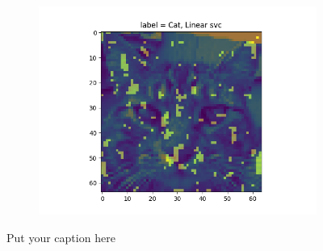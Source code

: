 \documentclass{article}
\begin{document}
\begin{figure}[H]
\begin{subfigure}{.33\textwidth}
  \label{fig:sub-second}
\end{subfigure}
\begin{subfigure}{.33\textwidth}
  \centering
  \includegraphics[width=1\linewidth]{1b/Imp_feat_svc.png}  
  
  \label{fig:sub-second}
\end{subfigure}
\caption{Put your caption here}
\label{imp pixels}
\end{figure}
\end{document}
